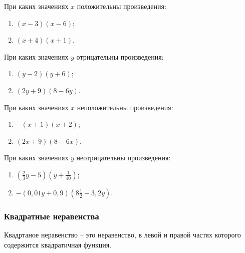 \documentclass[algebra,twocolumn]{pum}
\begin{document}
\begin{exercises}
  \begin{question}
    При каких значениях $x$ положительны произведения:
    \begin{multicols}{2}
      \begin{enumerate}
        \item $(x-3)(x-6)$;
        \item $(x+4)(x+1)$.
      \end{enumerate}
    \end{multicols}
  \end{question}
  \begin{question}
    При каких значениях $y$ отрицательны произведения:
    \begin{multicols}{2}
      \begin{enumerate}
        \item $(y-2)(y+6)$;
        \item $(2y+9)(8-6y)$.
      \end{enumerate}
    \end{multicols}
  \end{question}
  \begin{question}
    При каких значениях $x$ неположительны произведения:
    \begin{multicols}{2}
      \begin{enumerate}
        \item $-(x+1)(x+2)$;
        \item $(2x+9)(8-6x)$.
      \end{enumerate}
    \end{multicols}
  \end{question}
  \begin{question}
    При каких значениях $y$ неотрицательны произведения:
      \begin{enumerate}
        \item $\left(\frac{2}{3}y-5\right)\left(y+\frac{1}{10}\right)$;
        \item $-(0,01y+0,9)\left(8\frac{1}{2}-3,2y\right)$.
      \end{enumerate}
  \end{question}
\end{exercises}

\subsubsection*{Квадратные неравенства}
Квадртаное неравенство -- это неравенство, в левой и правой частях которого содержится квадратичная функция.
\end{document}
